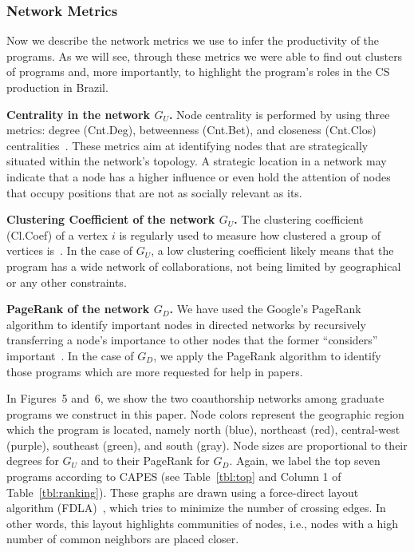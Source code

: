 \documentclass[10pt]{article}
\begin{document}
\subsubsection*{Network Metrics}

Now we describe the network metrics we use to infer the productivity of the programs. As
we will see, through these metrics we were able to find out clusters of programs and, more
importantly, to highlight the program's roles in the CS production in Brazil.

\par{\textbf{Centrality in the network $G_U$.}} 
Node centrality is performed by using three metrics: degree (Cnt.Deg), betweenness (Cnt.Bet), and closeness (Cnt.Clos)
 centralities~\cite{Bonacich:1987:AFM}. These metrics aim at identifying nodes that are strategically
situated within the network's topology. A strategic location in a network may indicate that a node
has a higher influence or even hold the attention of nodes that occupy positions that are not as
socially relevant as its. 

\par{\textbf{Clustering Coefficient of the network $G_U$.}}
The clustering coefficient (Cl.Coef) of a vertex $i$ is regularly used to measure how clustered a group of vertices
is~\cite{vazdemelo:2008a}. In the case of $G_U$, a low clustering coefficient likely means that the program has a wide
network of collaborations, not being limited by geographical or any other constraints.

\par{\textbf{PageRank of the network $G_D$.}} 
We have used the Google's PageRank algorithm to identify important nodes in directed networks by
recursively transferring a node's importance to other nodes that the former ``considers'' important~\cite{langville2009google}. In the case of $G_D$, we apply the PageRank algorithm to identify those programs which are more requested for help in papers.

In Figures~5 and~6, we show the two coauthorship networks among graduate programs we construct in this paper.
Node colors represent the geographic region which the program is located, namely north (blue), northeast (red), central-west
(purple), southeast (green), and south (gray). 
Node sizes are proportional to their degrees for $G_U$ and to their PageRank for $G_D$.  Again, we label the top seven
programs according to CAPES (see Table~\ref{tbl:top} and Column 1 of Table~\ref{tbl:ranking}). These graphs are drawn using a
force-direct layout algorithm (FDLA)~\cite{fruchterman:1991}, which tries to minimize the number of crossing edges. In other
words, this layout highlights communities of nodes, i.e., nodes with a high number of common neighbors are placed closer.
\end{document}
